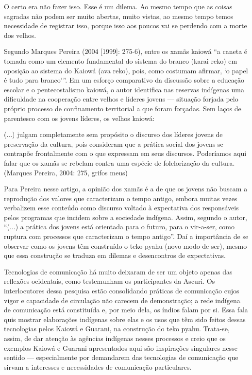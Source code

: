 \documentclass{article}
\begin{document}
O certo era n\~ao fazer isso. Esse \'e um dilema. Ao mesmo tempo que as
coisas sagradas n\~ao podem ser muito abertas, muito vistas, ao mesmo
tempo temos necessidade de registrar isso, porque isso aos poucos vai
se perdendo com a morte dos velhos.

Segundo Marques Pereira (2004 [1999]: 275-6), entre os xam\~as kaiow\'a
{\textquotedblleft}a caneta \'e tomada como um elemento fundamental do
sistema do branco (karai reko) em oposi\c{c}\~ao ao sistema do Kaiow\'a
(ava reko), pois, como costumam afirmar, {\textquoteleft}o papel \'e
tudo para branco{\textquoteright}{\textquotedblright}. Em um
esfor\c{c}o comparativo da discuss\~ao sobre a educa\c{c}\~ao escolar e
o pentecostalismo kaiow\'a, o autor identifica nas reservas ind\'igenas
uma dificuldade na coopera\c{c}\~ao entre velhos e l\'ideres jovens ---
situa\c{c}\~ao forjada pelo pr\'oprio processo de confinamento
territorial a que foram for\c{c}adas. Sem la\c{c}os de parentesco com
os jovens l\'ideres, os velhos kaiow\'a:

(...) julgam completamente sem prop\'osito o discurso dos l\'ideres
jovens de {\textquotesingle}preserva\c{c}\~ao da
cultura{\textquotesingle}, pois consideram que a pr\'atica social dos
jovens se contrap\~oe frontalmente com o que expressam em seus
discursos. Poder\'iamos aqui falar que os xam\~as se rebelam contra uma
esp\'ecie de folcloriza\c{c}\~ao da cultura. (Marques Pereira, 2004: 
275, grifos meus)

Para Pereira nesse artigo, a opini\~ao dos xam\~as \'e a de que os
jovens n\~ao buscam a reprodu\c{c}\~ao dos valores que caracterizam o
tempo antigo, embora muitas vezes verbalizem esse conte\'udo como
discurso voltado \`a expectativa dos respons\'aveis pelos programas que
incidem sobre a sociedade ind\'igena. Assim, segundo o autor,
{\textquotedblleft}(...) a pr\'atica dos jovens est\'a orientada para o
futuro, para o vir-a-ser, como ruptura com processos que caracterizam o
tempo antigo{\textquotedblright}. Da\'i a import\^ancia de se observar
como os jovens t\^em constru\'ido o teko pyahu (novo modo de ser),
mesmo que essa constru\c{c}\~ao se traduza em dilemas e desencontros de
expectativas.

Tecnologias de comunica\c{c}\~ao h\'a muito deixaram de ser um objeto
apenas das reflex\~oes ocidentais, como testemunham os participantes da
Ascuri. Os interlocutores dessa pesquisa est\~ao consolidando
pr\'aticas de comunica\c{c}\~ao cujos vigor e capacidade de
circula\c{c}\~ao n\~ao carecem de demonstra\c{c}\~ao; a rede ind\'igena
de comunica\c{c}\~ao est\'a constitu\'ida e, por meio dela, os \'indios
falam por si. Essa fala quis mostrar elabora\c{c}\~oes ind\'igenas
sobre elas e os usos que t\^em sido feitos dessas tecnologias pelos
Kaiow\'a e Guarani, na constru\c{c}\~ao do teko pyahu. Trata-se, assim,
de dar aten\c{c}\~ao \`as ag\^encias ind\'igenas nesses processos e
creio que os exemplos Kaiow\'a e Guarani apresentados aqui s\~ao
inspira\c{c}\~oes singulares nesse sentido --- especialmente por
demandarem das tecnologias de comunica\c{c}\~ao que sirvam a interesses
e necessidades de comunica\c{c}\~ao particulares. 
\end{document}
